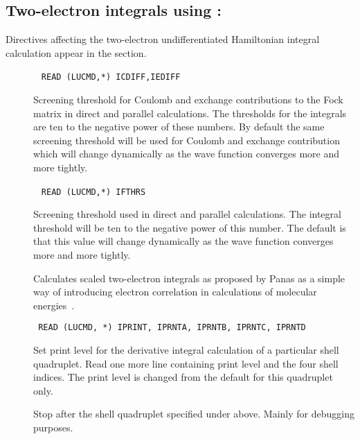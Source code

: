 
\subsection{Two-electron integrals using {\twoint}: }

Directives affecting the two-electron
undifferentiated Hamiltonian
integral calculation appear in the  section.
\begin{description}
\item[]\verb| |\newline
\verb|READ (LUCMD,*) ICDIFF,IEDIFF|

Screening threshold for Coulomb and exchange
contributions to the Fock
matrix in direct and parallel calculations. The thresholds for the
integrals are ten to the negative power of these numbers. By default the same
screening threshold will be used for Coulomb and exchange
contribution which will change dynamically as the wave function
converges more and more tightly.

\item[]\verb| |\newline
\verb|READ (LUCMD,*) IFTHRS|

Screening threshold used in direct and
parallel calculations. The integral threshold will be ten to the
negative power of this number. The default is that this value will change dynamically as the wave function converges more and more tightly.

\item[] Calculates scaled two-electron integrals as
proposed by Panas as a simple way of introducing electron
correlation in calculations of molecular energies~\cite{ipcpl245}.

\item[]\verb| |\newline
\verb|READ (LUCMD, *) IPRINT, IPRNTA, IPRNTB, IPRNTC, IPRNTD|

Set print level for the derivative integral calculation of a particular shell
quadruplet.  Read one more line containing print level and the four
shell indices.  The print level is changed from the default
for this quadruplet only.

\item[] Stop after the shell quadruplet specified
under  above. Mainly for debugging purposes.


\end{description}
